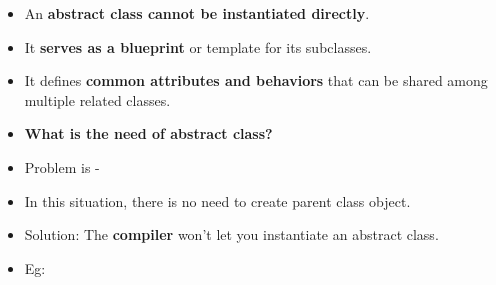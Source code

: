 \setlength{\columnsep}{3pt}
\begin{flushleft}

	\begin{itemize}
		\item An \textbf{abstract class cannot be instantiated directly}.
		\item It \textbf{serves as a blueprint} or template for its subclasses. 
		\item It defines \textbf{common attributes and behaviors} that can be shared among multiple related classes. 
		
		\newpage
		\item \textbf{What is the need of abstract class?}
		
		\item Problem is -
		
		\item In this situation, there is no need to create parent class object.
		\newpage
		\item Solution: The \textbf{compiler} won’t let you instantiate an abstract class.

		\bigskip
		\item Eg:
	\end{itemize}
\end{flushleft}

